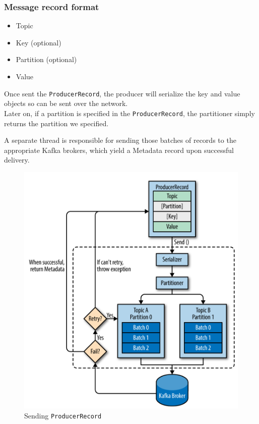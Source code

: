 \subsubsection{Message record format}
\begin{paracol}{2}
   \begin{itemize}
      \item Topic
      \item Key  (optional)
      \item Partition  (optional)
      \item Value
   \end{itemize}
   
   Once sent the \texttt{ProducerRecord}, the
   producer will serialize the key and value
   objects so can be sent over the network.\\
   Later on, if a partition is
   specified in the \texttt{ProducerRecord}, the partitioner simply returns the partition we specified.
   
   A separate thread is responsible for sending those batches of records to the appropriate Kafka brokers,
   which yield a Metadata record upon successful delivery.


   \switchcolumn

   \begin{figure}[htbp]
      \centering
      \includegraphics{images/16/producerRecord.png}
      \caption{Sending \texttt{ProducerRecord}}
      \label{fig:16/producerRecord}
   \end{figure}

\end{paracol}


